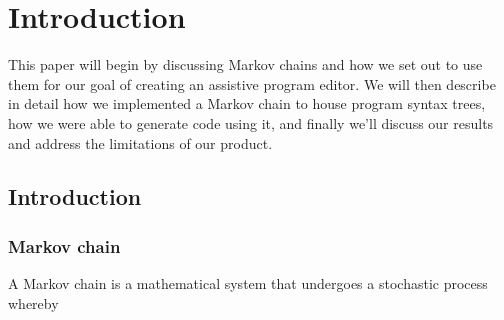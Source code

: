 
\chapter{Introduction}

This paper will begin by discussing Markov chains and how we set out to use them for our goal of creating an assistive program editor. We will then describe in detail how we implemented a Markov chain to house program syntax trees, how we were able to generate code using it, and finally we'll discuss our results and address the limitations of our product.

\section{Introduction}

\subsection{Markov chain}

A Markov chain is a mathematical system that undergoes a stochastic process whereby


